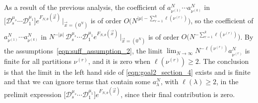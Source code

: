\documentclass[11pt]{article}
\theoremstyle{plain}
\newcommand{\D}{\mathcal D}
\newcommand{\la}{\lambda}
\newcommand{\vecx}{\vec{x}}
\begin{document}
As a result of the previous analysis, the coefficient of $a_{\nu^{(1)}}^N\cdots a_{\nu^{(k)}}^N$ in $\Big[ \D_s^{\mu_s}\cdots\D_1^{\mu_1} \Big] e^{ F_{N,\theta}(\vecx) } \,\big|_{\vecx=(0^N)}$ is of order $O\big(N^{|\mu|-\sum_{r=1}^k{\ell(\nu^{(r)})}}\big)$, so the coefficient of $a_{\nu^{(1)}}^N\cdots a_{\nu^{(k)}}^N$ in $N^{-|\mu|}\, \D_s^{\mu_s}\cdots\D_1^{\mu_1} e^{ F_{N,\theta}(\vecx) } \,\big|_{\vecx=(0^N)}$ is of order $O\big(N^{-\sum_{r=1}^k{\ell(\nu^{(r)})}}\big)$.
By the assumptions~\eqref{eqn:suff_assumption_2}, the limit $\lim_{N\to\infty}{N^{-\ell(\nu^{(r)})}a^N_{\nu^{(r)}}}$ is finite for all partitions $\nu^{(r)}$, and it is zero when $\ell(\nu^{(r)})\ge 2$.
The conclusion is that the limit in the left hand side of \eqref{eqn:goal2_section_4} exists and is finite and that we can ignore terms that contain some $a^N_\la$, with $\ell(\la)\ge 2$, in the prelimit expression $\Big[ \D_s^{\mu_s}\cdots\D_1^{\mu_1} \Big] e^{ F_{N,\theta}(\vecx) }$, since their final contribution is zero.

\smallskip
\end{document}
